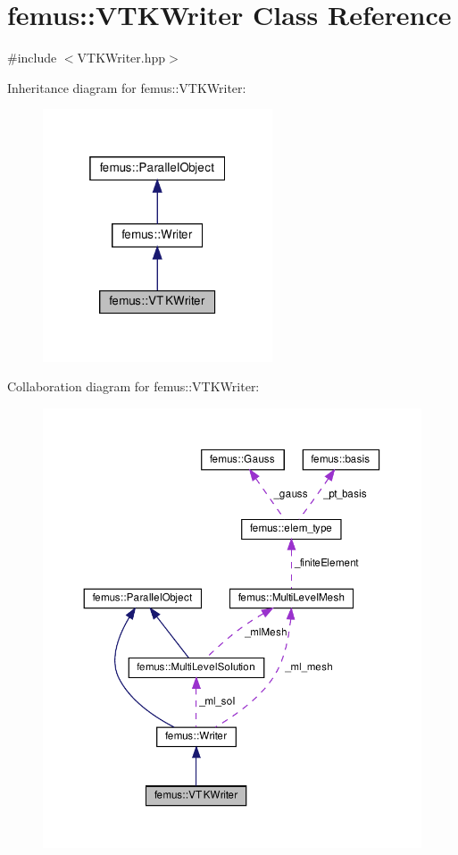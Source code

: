 \hypertarget{classfemus_1_1_v_t_k_writer}{}\section{femus\+:\+:V\+T\+K\+Writer Class Reference}
\label{classfemus_1_1_v_t_k_writer}


{\ttfamily \#include $<$V\+T\+K\+Writer.\+hpp$>$}



Inheritance diagram for femus\+:\+:V\+T\+K\+Writer\+:
\nopagebreak
\begin{figure}[H]
\begin{center}
\leavevmode
\includegraphics[width=193pt]{classfemus_1_1_v_t_k_writer__inherit__graph}
\end{center}
\end{figure}


Collaboration diagram for femus\+:\+:V\+T\+K\+Writer\+:
\nopagebreak
\begin{figure}[H]
\begin{center}
\leavevmode
\includegraphics[width=350pt]{classfemus_1_1_v_t_k_writer__coll__graph}
\end{center}
\end{figure}
